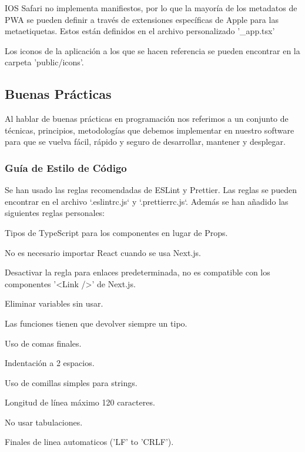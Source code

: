 \documentclass[12pt,twoside,titlepage]{report}
\begin{document}
IOS Safari no implementa manifiestos, por lo que la mayoría de los metadatos de PWA se pueden definir a través de extensiones específicas de Apple para las metaetiquetas. Estos están definidos en el archivo personalizado '\_app.tsx'

Los iconos de la aplicación a los que se hacen referencia se pueden encontrar en la carpeta 'public/icons'.


\subsection{Buenas Prácticas}

Al hablar de buenas prácticas en programación nos referimos a un conjunto de técnicas, principios, metodologías que debemos implementar en nuestro software para que se vuelva fácil, rápido y seguro de desarrollar, mantener y desplegar.

\subsubsection{Guía de Estilo de Código}

Se han usado las reglas recomendadas de ESLint y Prettier. Las reglas se pueden encontrar en el archivo `.eslintrc.js` y `.prettierrc.js`. Además se han añadido las siguientes reglas personales:

\begin{compactitem}
    \item Tipos de TypeScript para los componentes en lugar de Props.
    \item No es necesario importar React cuando se usa Next.js.
    \item Desactivar la regla para enlaces predeterminada, no es compatible con los componentes '<Link />' de Next.js.
    \item Eliminar variables sin usar.
    \item Las funciones tienen que devolver siempre un tipo.
    \item Uso de comas finales.
    \item Indentación a 2 espacios.
    \item Uso de comillas simples para strings.
    \item Longitud de línea máximo 120 caracteres.
    \item No usar tabulaciones.
    \item Finales de linea automaticos ('LF' to 'CRLF').
\end{compactitem}
\end{document}
